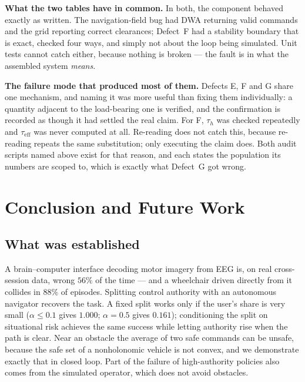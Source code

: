 \documentclass[11pt,a4paper]{article}
\theoremstyle{plain}
\theoremstyle{definition}
\begin{document}
\textbf{What the two tables have in common.} In both, the component
behaved exactly as written. The navigation-field bug had DWA returning
valid commands and the grid reporting correct clearances; Defect~F had a
stability boundary that is exact, checked four ways, and
simply not about the loop being simulated. Unit tests cannot catch
either, because nothing is broken --- the fault is in what the assembled
system \emph{means}.

\textbf{The failure mode that produced most of them.} Defects E, F and G
share one mechanism, and naming it was more useful than fixing them
individually: a quantity adjacent to the load-bearing one is verified,
and the confirmation is recorded as though it had settled the real claim.
For F, $\tau_h$ was checked repeatedly and $\tau_{\mathrm{eff}}$ was never
computed at all. Re-reading does not catch this, because re-reading
repeats the same substitution; only executing the claim does. Both audit
scripts named above exist for that reason, and each states the population
its numbers are scoped to, which is exactly what Defect~G got wrong.

\section{Conclusion and Future Work}

\subsection{What was established}

A brain--computer interface decoding motor imagery from EEG is, on real
cross-session data, wrong $56\%$ of the time --- and a wheelchair driven
directly from it collides in $88\%$ of episodes. Splitting control
authority with an autonomous navigator recovers the task. A fixed split
works only if the user's share is very small ($\alpha \le 0.1$ gives
$1.000$; $\alpha = 0.5$ gives $0.161$); conditioning the split on
situational risk achieves the same success while letting authority rise
when the path is clear. Near an obstacle the average of two safe
commands can be unsafe, because the safe set of a nonholonomic vehicle
is not convex, and we demonstrate exactly that in closed loop. Part of
the failure of high-authority policies also comes from the simulated
operator, which does not avoid obstacles.
\end{document}
